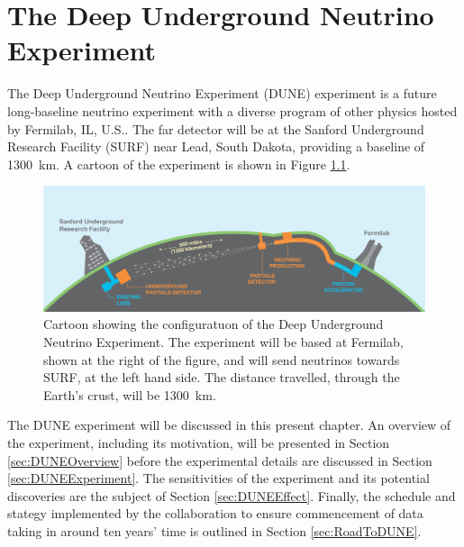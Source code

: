 
\graphicspath{{DUNE/Figs/}}

\chapter{The Deep Underground Neutrino Experiment}\label{chap:DUNE}

The Deep Underground Neutrino Experiment (DUNE) experiment \cite{DUNECDR1,DUNECDR2,DUNECDR3,DUNECDR4} is a future long-baseline neutrino experiment with a diverse program of other physics hosted by Fermilab, IL, U.S..  The far detector will be at the Sanford Underground Research Facility (SURF) near Lead, South Dakota, providing a baseline of 1300~km.  A cartoon of the experiment is shown in Figure \ref{fig:DUNE}.

\begin{figure}
  \centering
  \includegraphics[width=14cm]{DUNE.jpg}
  \caption[Cartoon showing the configuration of the Deep Underground Neutrino Experiment.]{Cartoon showing the configuratuon of the Deep Underground Neutrino Experiment.  The experiment will be based at Fermilab, shown at the right of the figure, and will send neutrinos towards SURF, at the left hand side.  The distance travelled, through the Earth's crust, will be 1300~km.}
  \label{fig:DUNE}
\end{figure}

The DUNE experiment will be discussed in this present chapter.  An overview of the experiment, including its motivation, will be presented in Section \ref{sec:DUNEOverview} before the experimental details are discussed in Section \ref{sec:DUNEExperiment}.  The sensitivities of the experiment and its potential discoveries are the subject of Section \ref{sec:DUNEEffect}.  Finally, the schedule and stategy implemented by the collaboration to ensure commencement of data taking in around ten years' time is outlined in Section \ref{sec:RoadToDUNE}.

